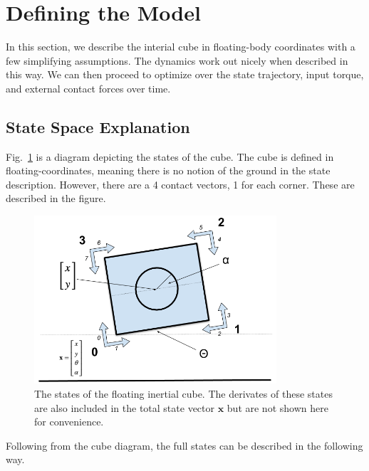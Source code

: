 \documentclass[conference]{IEEEtran}
\begin{document}
\section{Defining the Model}

In this section, we describe the interial cube in floating-body coordinates with a few simplifying assumptions. The dynamics work out nicely when described in this way. We can then proceed to optimize over the state trajectory, input torque, and external contact forces over time.

\subsection{State Space Explanation}

Fig.~\ref{fig:cube} is a diagram depicting the states of the cube. The cube is defined in floating-coordinates, meaning there is no notion of the ground in the state description. However, there are a 4 contact vectors, 1 for each corner. These are described in the figure.

\begin{figure}[htbp]
\centerline{\includegraphics[width=9cm,keepaspectratio]{media/cube_states.png}}
\caption{The states of the floating inertial cube. The derivates of these states are also included in the total state vector $\textbf{x}$ but are not shown here for convenience.}
\label{fig:cube}
\end{figure}

Following from the cube diagram, the full states can be described in the following way. \\
\end{document}
